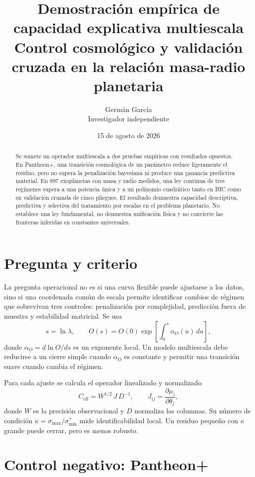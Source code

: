\documentclass[10pt,twocolumn]{article}
\title{\textbf{Demostración empírica de capacidad explicativa multiescala}\\
\large Control cosmológico y validación cruzada en la relación masa-radio planetaria}
\author{Germán García\\\small Investigador independiente}
\date{15 de agosto de 2026}
\begin{document}
\maketitle

\begin{abstract}
Se somete un operador multiescala a dos pruebas empíricas con resultados
opuestos. En Pantheon+, una transición cosmológica de un parámetro reduce
ligeramente el residuo, pero no supera la penalización bayesiana ni produce
una ganancia predictiva material. En 897 exoplanetas con masa y radio
medidos, una ley continua de tres regímenes supera a una potencia única y a
un polinomio cuadrático tanto en BIC como en validación cruzada de cinco
pliegues. El resultado demuestra capacidad descriptiva, predictiva y
selectiva del tratamiento por escalas en el problema planetario. No
establece una ley fundamental, no demuestra unificación física y no convierte
las fronteras inferidas en constantes universales.
\end{abstract}

\section{Pregunta y criterio}

La pregunta operacional no es si una curva flexible puede ajustarse a los
datos, sino si una coordenada común de escala permite identificar cambios de
régimen que sobrevivan tres controles: penalización por complejidad,
predicción fuera de muestra y estabilidad matricial. Se usa
\begin{equation}
 s=\ln\lambda, \qquad
 O(s)=O(0)\exp\left[\int_0^s \alpha_O(u)\,du\right],
 \label{eq:general}
\end{equation}
donde $\alpha_O=d\ln O/ds$ es un exponente local. Un modelo multiescala debe
reducirse a un cierre simple cuando $\alpha_O$ es constante y permitir una
transición suave cuando cambia el régimen.

Para cada ajuste se calcula el operador linealizado y normalizado
\begin{equation}
 C_{\mathrm{eff}}=W^{1/2}\,J\,D^{-1},
 \qquad J_{ij}=\frac{\partial \mu_i}{\partial\theta_j},
\end{equation}
donde $W$ es la precisión observacional y $D$ normaliza las columnas. Su
número de condición $\kappa=\sigma_{\max}/\sigma_{\min}^{+}$ mide
identificabilidad local. Un residuo pequeño con $\kappa$ grande puede cerrar,
pero es menos robusto.

\section{Control negativo: Pantheon+}
\end{document}
